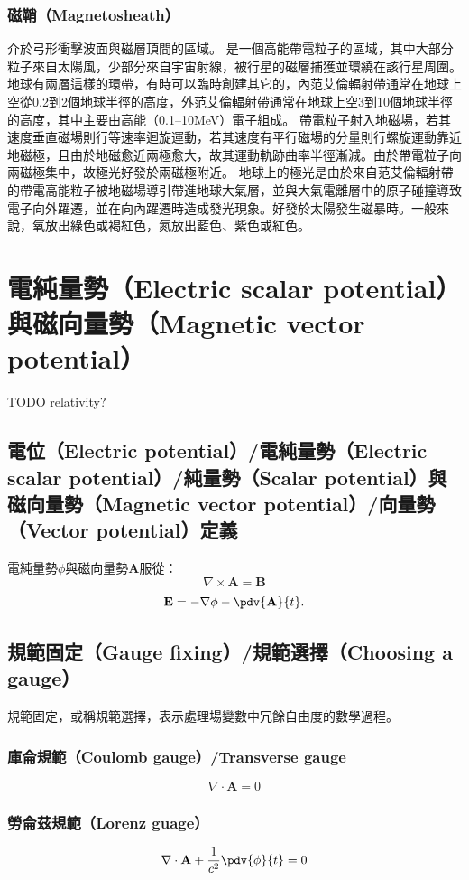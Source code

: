 \documentclass[a4paper,12pt]{report}
\begin{document}
\begin{itemize}
\subsubsection{磁鞘（Magnetosheath）}
介於弓形衝擊波面與磁層頂間的區域。
是一個高能帶電粒子的區域，其中大部分粒子來自太陽風，少部分來自宇宙射線，被行星的磁層捕獲並環繞在該行星周圍。地球有兩層這樣的環帶，有時可以臨時創建其它的，內范艾倫輻射帶通常在地球上空從0.2到2個地球半徑的高度，外范艾倫輻射帶通常在地球上空3到10個地球半徑的高度，其中主要由高能（0.1–10MeV）電子組成。
帶電粒子射入地磁場，若其速度垂直磁場則行等速率迴旋運動，若其速度有平行磁場的分量則行螺旋運動靠近地磁極，且由於地磁愈近兩極愈大，故其運動軌跡曲率半徑漸減。由於帶電粒子向兩磁極集中，故極光好發於兩磁極附近。
地球上的極光是由於來自范艾倫輻射帶的帶電高能粒子被地磁場導引帶進地球大氣層，並與大氣電離層中的原子碰撞導致電子向外躍遷，並在向內躍遷時造成發光現象。好發於太陽發生磁暴時。一般來說，氧放出綠色或褐紅色，氮放出藍色、紫色或紅色。


\section{電純量勢（Electric scalar potential）與磁向量勢（Magnetic vector potential）}
TODO
relativity?
\subsection{電位（Electric potential）/電純量勢（Electric scalar potential）/純量勢（Scalar potential）與磁向量勢（Magnetic vector potential）/向量勢（Vector potential）定義}
電純量勢$\phi$與磁向量勢$\mathbf{A}$服從：
\[ \nabla \times \mathbf{A} = \mathbf{B}\]
\[\mathbf{E} = - \nabla \phi - \pdv{\mathbf{A} }{t}.\]
\subsection{規範固定（Gauge fixing）/規範選擇（Choosing a gauge）}
規範固定，或稱規範選擇，表示處理場變數中冗餘自由度的數學過程。
\subsubsection{庫侖規範（Coulomb gauge）/Transverse gauge}
\[ \nabla \cdot \mathbf{A} = 0\]
\subsubsection{勞侖茲規範（Lorenz guage）}
\[\nabla \cdot \mathbf{A} + \frac{1}{c^2} \pdv{\phi}{t} = 0\]

\end{itemize}
\end{document}
